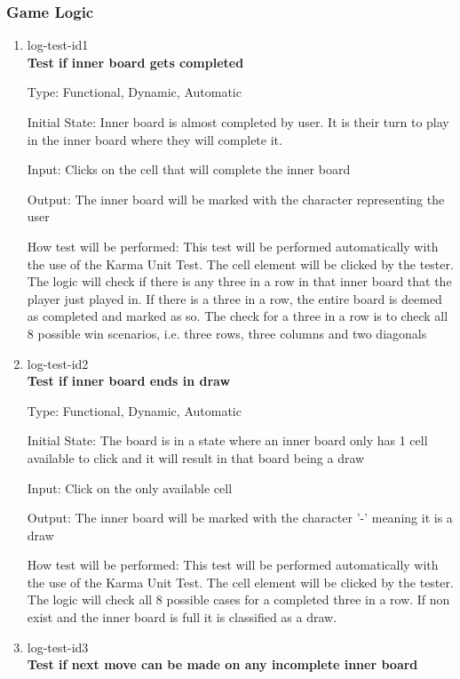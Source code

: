 \documentclass[12pt, titlepage]{article}
\begin{document}
\subsubsection{Game Logic}

\begin{enumerate}

\item{log-test-id1\\}
\textbf{Test if inner board gets completed}

Type: Functional, Dynamic, Automatic
					
Initial State: Inner board is almost completed by user. It is their turn to play in the inner board where they will complete it. 
					
Input: Clicks on the cell that will complete the inner board
					
Output: The inner board will be marked with the character representing the user
					
How test will be performed: This test will be performed automatically with the use of the Karma Unit Test. The cell element will be clicked by the tester. The logic will check if there is any three in a row in that inner board that the player just played in. If there is a three in a row, the entire board is deemed as completed and marked as so. The check for a three in a row is to check all 8 possible win scenarios, i.e. three rows, three columns and two diagonals

\item{log-test-id2\\}
\textbf{Test if inner board ends in draw}

Type: Functional, Dynamic, Automatic
					
Initial State: The board is in a state where an inner board only has 1 cell available to click and it will result in that board being a draw

Input: Click on the only available cell
					
Output: The inner board will be marked with the character '-' meaning it is a draw
					
How test will be performed: This test will be performed automatically with the use of the Karma Unit Test. The cell element will be clicked by the tester. The logic will check all 8 possible cases for a completed three in a row. If non exist and the inner board is full it is classified as a draw.

\item{log-test-id3\\}
\textbf{Test if next move can be made on any incomplete inner board}


\end{enumerate}
\end{document}
